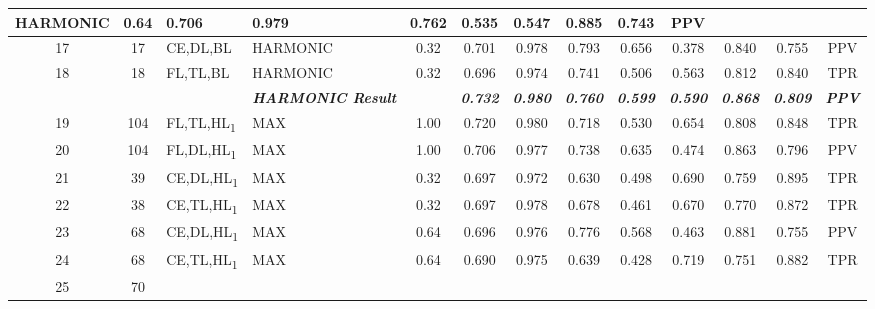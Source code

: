 \begin{table}[H]
{\begin{tabular}{ccl|l|c|c|c|c|c|c|c|c|c|}
    HARMONIC &
    0.64 &
    0.706 &
    0.979 &
    0.762 &
    0.535 &
    0.547 &
    0.885 &
    0.743 &
    PPV \\ \hline
  \multicolumn{1}{|c|}{17} &
    \multicolumn{1}{c|}{17} &
    CE,DL,BL &
    HARMONIC &
    0.32 &
    0.701 &
    0.978 &
    0.793 &
    0.656 &
    0.378 &
    0.840 &
    0.755 &
    PPV \\ \hline
  \multicolumn{1}{|c|}{18} &
    \multicolumn{1}{c|}{18} &
    FL,TL,BL &
    HARMONIC &
    0.32 &
    0.696 &
    0.974 &
    0.741 &
    0.506 &
    0.563 &
    0.812 &
    0.840 &
    TPR \\ \hline
   &
    \textit{\textbf{}} &
     &
    \textit{\textbf{HARMONIC Result}} &
     &
    \textit{\textbf{0.732}} &
    \textit{\textbf{0.980}} &
    \textit{\textbf{0.760}} &
    \textit{\textbf{0.599}} &
    \textit{\textbf{0.590}} &
    \textit{\textbf{0.868}} &
    \textit{\textbf{0.809}} &
    \textit{\textbf{PPV}} \\ \hline
  \multicolumn{1}{|c|}{19} &
    \multicolumn{1}{c|}{104} &
    FL,TL,HL\textsubscript{1} &
    MAX &
    1.00 &
    0.720 &
    0.980 &
    0.718 &
    0.530 &
    0.654 &
    0.808 &
    0.848 &
    TPR \\ \hline
  \multicolumn{1}{|c|}{20} &
    \multicolumn{1}{c|}{104} &
    FL,DL,HL\textsubscript{1} &
    MAX &
    1.00 &
    0.706 &
    0.977 &
    0.738 &
    0.635 &
    0.474 &
    0.863 &
    0.796 &
    PPV \\ \hline
  \multicolumn{1}{|c|}{21} &
    \multicolumn{1}{c|}{39} &
    CE,DL,HL\textsubscript{1} &
    MAX &
    0.32 &
    0.697 &
    0.972 &
    0.630 &
    0.498 &
    0.690 &
    0.759 &
    0.895 &
    TPR \\ \hline
  \multicolumn{1}{|c|}{22} &
    \multicolumn{1}{c|}{38} &
    CE,TL,HL\textsubscript{1} &
    MAX &
    0.32 &
    0.697 &
    0.978 &
    0.678 &
    0.461 &
    0.670 &
    0.770 &
    0.872 &
    TPR \\ \hline
  \multicolumn{1}{|c|}{23} &
    \multicolumn{1}{c|}{68} &
    CE,DL,HL\textsubscript{1} &
    MAX &
    0.64 &
    0.696 &
    0.976 &
    0.776 &
    0.568 &
    0.463 &
    0.881 &
    0.755 &
    PPV \\ \hline
  \multicolumn{1}{|c|}{24} &
    \multicolumn{1}{c|}{68} &
    CE,TL,HL\textsubscript{1} &
    MAX &
    0.64 &
    0.690 &
    0.975 &
    0.639 &
    0.428 &
    0.719 &
    0.751 &
    0.882 &
    TPR \\ \hline
  \multicolumn{1}{|c|}{25} &
    \multicolumn{1}{c|}{70} &

\end{tabular}}
\end{table}
